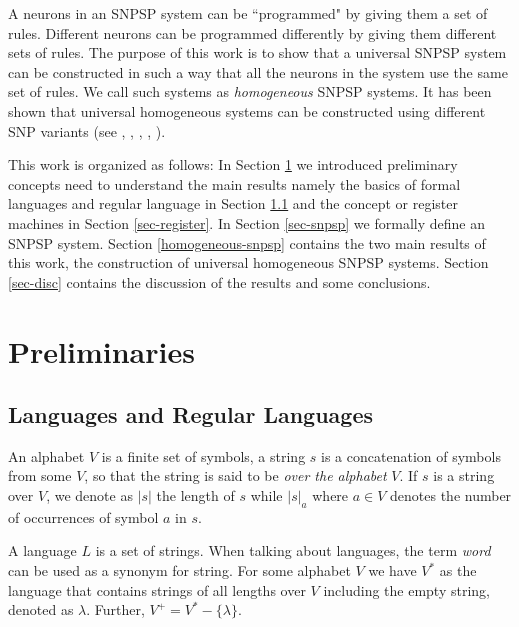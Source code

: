 \documentclass[smallextended]{svjour3}
\begin{document}
A neurons in an SNPSP system can be ``programmed" by giving them a set of rules. Different neurons can be programmed differently by giving them 
different sets of rules. The purpose of this work is to show that a universal SNPSP system can be constructed in such a way that all the neurons in
the system use the same set of rules. We call such systems as \textit{homogeneous} SNPSP systems. It has been shown that universal homogeneous systems
can be constructed using different SNP variants (see \cite{HSNP}, \cite{HISNP}, \cite{HSNP-R}, \cite{HSNP-S}, \cite{HSNP-A}).

This work is organized as follows: In Section \ref{sec-prelims} we introduced preliminary concepts need to understand the main results namely the
basics of formal languages and regular language in Section \ref{sec-lang-reg} and the concept or register machines in Section \ref{sec-register}. In
Section \ref{sec-snpsp} we formally define an SNPSP system. Section \ref{homogeneous-snpsp} contains the two main results of this work, the 
construction of universal homogeneous SNPSP systems. Section \ref{sec-disc} contains the discussion of the results and some conclusions.


\section{Preliminaries} \label{sec-prelims}

\subsection{Languages and Regular Languages} \label{sec-lang-reg}

An alphabet $V$ is a finite set of symbols, a string $s$ is a concatenation of symbols from some $V$, so that the string is said to be \textit{over
the alphabet} $V$. If $s$ is a string over $V$, we denote as $|s|$ the length of $s$ while $|s|_a$ where $a \in V$ denotes the number of occurrences 
of symbol $a$ in $s$. 
  
A language $L$ is a set of strings. When talking about languages, the term \textit{word} can be
used as a synonym for string. For some alphabet $V$ we have $V^*$ as the language that contains
strings of all lengths over $V$ including the empty string, denoted as $\lambda$. Further, 
$V^+ = V^* - \{\lambda\}$. 
\end{document}
